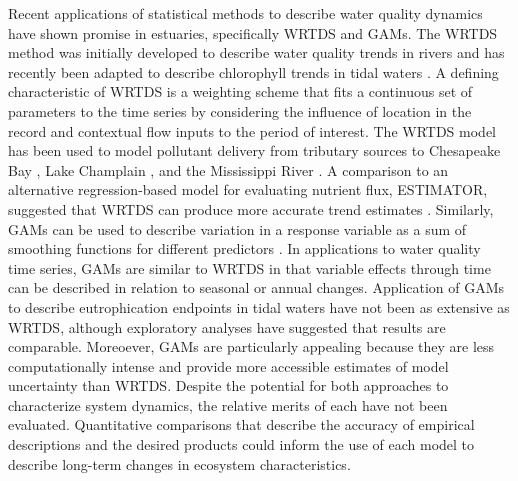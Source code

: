 \documentclass[letterpaper,12pt,oneside]{article}\usepackage[]{graphicx}\usepackage[]{color}
\begin{document}
Recent applications of statistical methods to describe water quality dynamics have shown promise in estuaries, specifically \ac{WRTDS} and \acp{GAM}.  The \ac{WRTDS} method was initially developed to describe water quality trends in rivers \citep{Hirsch10,Hirsch14} and has recently been adapted to describe chlorophyll trends in tidal waters \citep{Beck15}.  A defining characteristic of \ac{WRTDS} is a weighting scheme that fits a continuous set of parameters to the time series by considering the influence of location in the record and contextual flow inputs to the period of interest.  The \ac{WRTDS} model has been used to model pollutant delivery from tributary sources to Chesapeake Bay \citep{Hirsch10,Moyer12,Zhang13}, Lake Champlain \citep{Medalie12}, and the Mississippi River \citep{Sprague11}.  A comparison to an alternative regression-based model for evaluating nutrient flux, ESTIMATOR, suggested that \ac{WRTDS} can produce more accurate trend estimates \citep{Moyer12}. Similarly, \acp{GAM} can be used to describe variation in a response variable as a sum of smoothing functions for different predictors \citep{Hastie90,Wood06}.  In applications to water quality time series, \acp{GAM} are similar to \ac{WRTDS} in that variable effects through time can be described in relation to seasonal or annual changes.  Application of \acp{GAM} to describe eutrophication endpoints in tidal waters have not been as extensive as \ac{WRTDS}, although exploratory analyses have suggested that results are comparable.  Moreoever, \acp{GAM} are particularly appealing because they are less computationally intense and provide more accessible estimates of model uncertainty than \ac{WRTDS}.  Despite the potential for both approaches to characterize system dynamics, the relative merits of each have not been evaluated.  Quantitative comparisons that describe the accuracy of empirical descriptions and the desired products could inform the use of each model to describe long-term changes in ecosystem characteristics.
\end{document}

